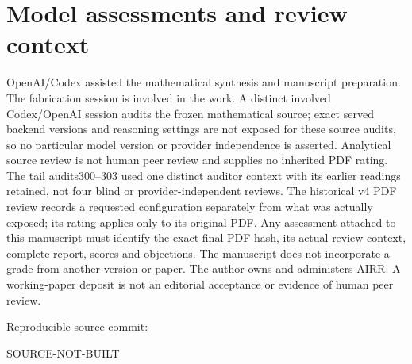 \documentclass[11pt]{article}
\providecommand{\SourceCommit}{SOURCE-NOT-BUILT}
\begin{document}
\section*{Model assessments and review context}
OpenAI/Codex assisted the mathematical synthesis and manuscript preparation.
The fabrication session is involved in the work. A distinct involved
Codex/OpenAI session audits the frozen mathematical source; exact served
backend versions and reasoning settings are not exposed for these source
audits, so no particular
model version or provider independence is asserted. Analytical source
review is not human peer review and supplies no inherited PDF rating.
The tail audits300--303 used one distinct auditor context with its earlier
readings retained, not four blind or provider-independent reviews. The
historical v4 PDF review records a requested configuration separately from
what was actually exposed; its rating applies only to its original PDF.
Any assessment attached to this manuscript must identify the exact final
PDF hash, its actual review context, complete report, scores and objections.
The manuscript does not incorporate a grade from another version or paper.
The author owns and administers AIRR. A working-paper deposit is not an
editorial acceptance or evidence of human peer review.

\smallskip\noindent
Reproducible source commit:\par\noindent
{\small\ttfamily\SourceCommit}
\end{document}
